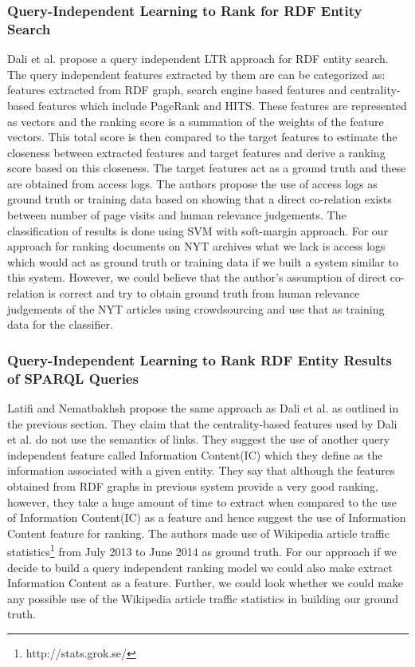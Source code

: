 \documentclass{article}
\begin{document}
    \subsubsection{Query-Independent Learning to Rank for RDF Entity Search}
    Dali et al.\cite{dali12} propose a query independent LTR approach for RDF entity search. The query independent features extracted by them are can be categorized as: features extracted from RDF graph, search engine based features and centrality-based features which include PageRank and HITS. These features are represented as vectors and the ranking score is a summation of the weights of the feature vectors. This total score is then compared to the target features to estimate the closeness between extracted features and target features and derive a ranking score based on this closeness. The target features act as a ground truth and these are obtained from access logs. The authors propose the use of access logs as ground truth or training data based on showing that a direct co-relation exists between number of page visits and human relevance judgements. The classification of results is done using SVM with soft-margin approach. For our approach for ranking documents on NYT archives what we lack is access logs which would act as ground truth or training data if we built a system similar to this system. However, we could believe that the author's assumption of direct co-relation is correct and try to obtain ground truth from human relevance judgements of the NYT articles using crowdsourcing and use that as training data for the classifier.

    \subsubsection{Query-Independent Learning to Rank RDF Entity Results of SPARQL Queries}
    Latifi and Nematbakhsh\cite{latifi14} propose the same approach as Dali et al.\cite{dali12} as outlined in the previous section. They claim that the centrality-based features used by Dali et al. do not use the semantics of links. They suggest the use of another query independent feature called Information Content(IC) which they define as the information associated with a given entity. They say that although the features obtained from RDF graphs in previous system provide a very good ranking, however, they take a huge amount of time to extract when compared to the use of Information Content(IC) as a feature and hence suggest the use of Information Content feature for ranking. The authors made use of Wikipedia article traffic statistics\footnote{http://stats.grok.se/} from July 2013 to June 2014 as ground truth. For our approach if we decide to build a query independent ranking model we could also make extract Information Content as a feature. Further, we could look whether we could make any possible use of the Wikipedia article traffic statistics in building our ground truth.
\end{document}
